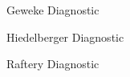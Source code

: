 


\begin{frame}{Geweke Diagnostic}
\end{frame}

\begin{frame}{Hiedelberger Diagnostic}
\end{frame}

\begin{frame}{Raftery Diagnostic}
\end{frame}

